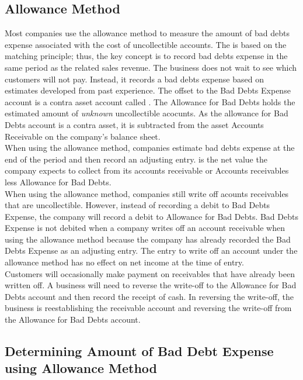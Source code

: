 \documentclass{article}
\begin{document}
\subsection{Allowance Method}

Most companies use the allowance method to measure the amount of bad debts expense associated with the cost of uncollectible accounts. The  is based on the matching principle; thus, the key concept is to record bad debts expense in the same period as the related sales revenue. The business does not wait to see which customers will not pay. Instead, it records a bad debts expense based on estimates developed from past experience. The offset to the Bad Debts Expense account is a contra asset account called . The Allowance for Bad Debts holds the estimated amount of \emph{unknown} uncollectible acocunts. As the allowance for Bad Debts account is a contra asset, it is subtracted from the asset Accounts Receivable on the company's balance sheet. \\  

When using the allowance method, companies estimate bad debts expense at the end of the period and then record an adjusting entry.  is the net value the company expects to collect from its accounts receivable or Accounts receivables less Allowance for Bad Debts. \\ 

When using the allowance method, companies still write off acounts receivables that are uncollectible. However, instead of recording a debit to Bad Debts Expense, the company will record a debit to Allowance for Bad Debts. Bad Debts Expense is not debited when a company writes off an account receivable when using the allowance method because the company has already recorded the Bad Debts Expense as an adjusting entry. The entry to write off an account under the allowance method has no effect on net income at the time of entry. \\ 

Customers will occasionally make payment on receivables that have already been written off. A business will need to reverse the write-off to the Allowance for Bad Debts account and then record the receipt of cash. In reversing the write-off, the business is reestablishing the receivable account and reversing the write-off from the Allowance for Bad Debts account. \\ 

\subsection{Determining Amount of Bad Debt Expense using Allowance Method}
\end{document}
